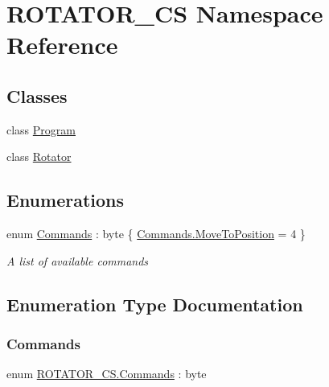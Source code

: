 \hypertarget{namespace_r_o_t_a_t_o_r___c_s}{}\section{R\+O\+T\+A\+T\+O\+R\+\_\+\+CS Namespace Reference}
\label{namespace_r_o_t_a_t_o_r___c_s}
\subsection*{Classes}
\begin{DoxyCompactItemize}
\item 
class \hyperlink{class_r_o_t_a_t_o_r___c_s_1_1_program}{Program}
\item 
class \hyperlink{class_r_o_t_a_t_o_r___c_s_1_1_rotator}{Rotator}
\end{DoxyCompactItemize}
\subsection*{Enumerations}
\begin{DoxyCompactItemize}
\item 
enum \hyperlink{namespace_r_o_t_a_t_o_r___c_s_a6ca87d84e7d1c303da63cac59cf97209}{Commands} \+: byte \{ \hyperlink{namespace_r_o_t_a_t_o_r___c_s_a6ca87d84e7d1c303da63cac59cf97209ad0b8917cb9f9e33a4ced929fe90a20f3}{Commands.\+Move\+To\+Position} = 4
 \}\begin{DoxyCompactList}\small\item\em A list of available commands \end{DoxyCompactList}
\end{DoxyCompactItemize}


\subsection{Enumeration Type Documentation}
\mbox{\label{namespace_r_o_t_a_t_o_r___c_s_a6ca87d84e7d1c303da63cac59cf97209}} 
\subsubsection{\texorpdfstring{Commands}{Commands}}
{\footnotesize\ttfamily enum \hyperlink{namespace_r_o_t_a_t_o_r___c_s_a6ca87d84e7d1c303da63cac59cf97209}{R\+O\+T\+A\+T\+O\+R\+\_\+\+C\+S.\+Commands} \+: byte\hspace{0.3cm}{\ttfamily [strong]}}




